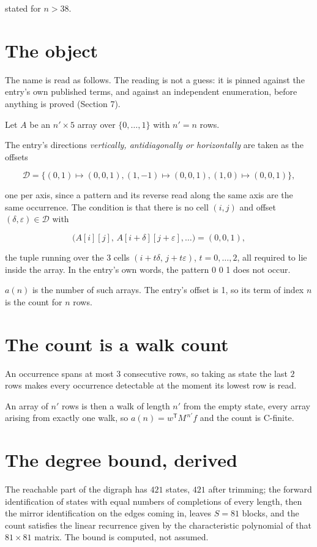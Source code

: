 \documentclass[11pt]{article}
\theoremstyle{definition}
\begin{document}
stated for $n > 38$.

\section{The object}

The name is read as follows. The reading is not a guess: it is pinned against the entry's own published terms, and against an independent enumeration, before anything is proved (Section 7).

Let $A$ be an $n' \times 5$ array over $\{0,\dots,1\}$ with $n' = n$ rows.

The entry's directions {\itshape vertically, antidiagonally or horizontally} are taken as the offsets

\[\mathcal{D} = \{(0,1)\mapsto(0,0,1), (1,-1)\mapsto(0,0,1), (1,0)\mapsto(0,0,1)\},\]

one per axis, since a pattern and its reverse read along the same axis are the same occurrence. The condition is that there is no cell $(i,j)$ and offset $(\delta,\varepsilon)\in\mathcal{D}$ with

\[\bigl(A[i][j],\,A[i{+}\delta][j{+}\varepsilon],\dots\bigr) = (0, 0, 1),\]

the tuple running over the $3$ cells $(i+t\delta,\,j+t\varepsilon)$, $t = 0,\dots,2$, all required to lie inside the array. In the entry's own words, the pattern 0 0 1 does not occur.

$a(n)$ is the number of such arrays. The entry's offset is 1, so its term of index $n$ is the count for $n$ rows.

\section{The count is a walk count}

An occurrence spans at most $3$ consecutive rows, so taking as state the last $2$ rows makes every occurrence detectable at the moment its lowest row is read.

An array of $n'$ rows is then a walk of length $n'$ from the empty state, every array arising from exactly one walk, so $a(n) = w^{\mathsf T}M^{\,n'}f$ and the count is C-finite.

\section{The degree bound, derived}

The reachable part of the digraph has $421$ states, $421$ after trimming; the forward identification of states with equal numbers of completions of every length, then the mirror identification on the edges coming in, leaves $S = 81$ blocks, and the count satisfies the linear recurrence given by the characteristic polynomial of that $81\times81$ matrix. The bound is computed, not assumed.
\end{document}
